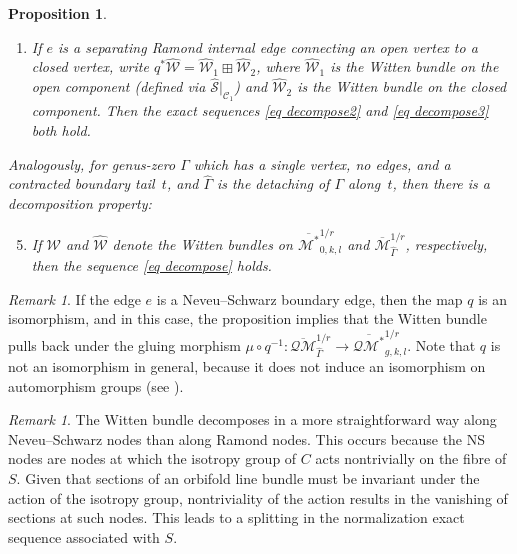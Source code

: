 \documentclass[11pt,a4paper]{article}
\newtheorem{pr}[dummy]{Proposition}
\theoremstyle{definition}
\theoremstyle{remark}
\newtheorem{rmk}[dummy]{Remark}
\newcommand{\oQMb}{{\overline{\mathcal{QM}}}}
\numberwithin{equation}{section}
\def\Mbar{{\overline{\mathcal M}}}
\def\Mbarstar{{\overline{\mathcal M^*}}}
\begin{document}
\begin{pr}
\begin{enumerate}
\item If $e$ is a separating Ramond internal edge connecting an open vertex to a closed vertex, write $q^*\widehat{\mathcal{W}} = \widehat{\mathcal{W}}_1 \boxplus \widehat{\mathcal{W}}_2$, where $\widehat{\mathcal{W}}_1$ is the Witten bundle on the open component (defined via $\widehat{\mathcal{S}}|_{\mathcal{C}_1}$) and $\widehat{\mathcal{W}}_2$ is the Witten bundle on the closed component.  Then the exact sequences \eqref{eq decompose2} and \eqref{eq decompose3} both hold.
\end{enumerate}
Analogously, for genus-zero $\Gamma$ which has a single vertex, no edges, and a contracted boundary tail~$t$, and $\widehat{\Gamma}$ is the detaching of $\Gamma$ along~$t$, then there is a decomposition property:
\begin{enumerate}
\setcounter{enumi}{4}
\item\label{it decompose cb tail} If ${\mathcal{W}}$ and $\widehat{\mathcal{W}}$ denote the Witten bundles on $\Mbarstar_{0,k,l}^{1/r}$ and $\Mbar_{\widehat\Gamma}^{1/r}$, respectively, then the sequence \eqref{eq decompose} holds.
\end{enumerate}
\end{pr}

  

\begin{rmk}\label{rmk decompose NS boundary node}
If the edge $e$ is a Neveu--Schwarz boundary edge, then the map $q$ is an isomorphism, and in this case, the proposition implies that the Witten bundle pulls back under the gluing morphism $\mu\circ q^{-1}\colon \oQMb_{\widehat\Gamma}^{1/r} \to \overline{\mathcal{QM}^*}_{g,k,l}^{1/r}$. Note that $q$ is not an isomorphism in general, because it does not induce
an isomorphism on automorphism groups (see \cite[Remark 4.5]{BCT1}).


\end{rmk}


\begin{rmk}
The Witten bundle decomposes in a more straightforward way along Neveu--Schwarz nodes than along Ramond nodes. This occurs because the NS nodes are nodes at which the isotropy group of $C$ acts nontrivially on the fibre of $S$.  Given that sections of an orbifold line bundle must be invariant under the action of the isotropy group, nontriviality of the action results in the vanishing of sections at such nodes. This leads to a splitting in the normalization exact sequence associated with $S$.
\end{rmk}
\end{document}
